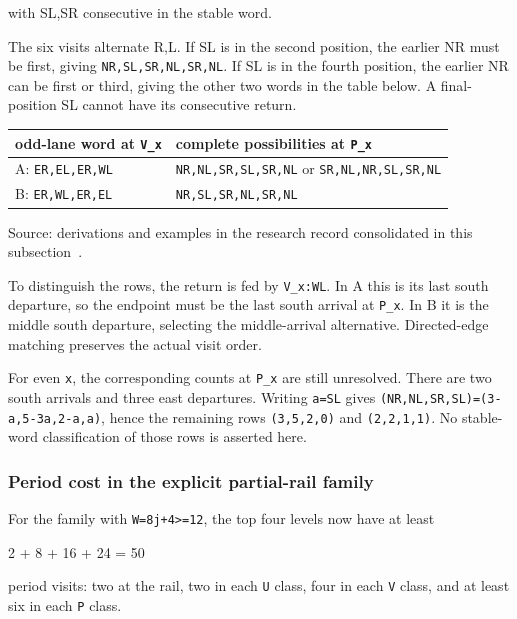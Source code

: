 \documentclass[11pt,letterpaper]{article}
\theoremstyle{plain}
\theoremstyle{definition}
\begin{document}
\begin{NoHyper}
with SL,SR consecutive in the stable word.

The six visits alternate R,L. If SL is in the second position, the earlier NR must be first, giving \texttt{NR,SL,SR,NL,SR,NL}. If SL is in the fourth position, the earlier NR can be first or third, giving the other two words in the table below. A final-position SL cannot have its consecutive return.

{\def\LTcaptype{table} %
\begin{longtable}[]{@{}ll@{}}
\toprule\noalign{}
odd-lane word at \texttt{V\_x} & complete possibilities at \texttt{P\_x} \\
\midrule\noalign{}
\endhead
\bottomrule\noalign{}
\endlastfoot
A: \texttt{ER,EL,ER,WL} & \texttt{NR,NL,SR,SL,SR,NL} or \texttt{SR,NL,NR,SL,SR,NL} \\
B: \texttt{ER,WL,ER,EL} & \texttt{NR,SL,SR,NL,SR,NL} \\
\end{longtable}
{\footnotesize Source: derivations and examples in the research record consolidated in this subsection~\cite{Repo}.\par}
}

To distinguish the rows, the return is fed by \texttt{V\_x:WL}. In A this is its last south departure, so the endpoint must be the last south arrival at \texttt{P\_x}. In B it is the middle south departure, selecting the middle-arrival alternative. Directed-edge matching preserves the actual visit order.

For even \texttt{x}, the corresponding counts at \texttt{P\_x} are still unresolved. There are two south arrivals and three east departures. Writing \texttt{a=SL} gives \texttt{(NR,NL,SR,SL)=(3-a,5-3a,2-a,a)}, hence the remaining rows \texttt{(3,5,2,0)} and \texttt{(2,2,1,1)}. No stable-word classification of those rows is asserted here.

\subsubsection{Period cost in the explicit partial-rail family}

For the family with \texttt{W=8j+4\textgreater{}=12}, the top four levels now have at least

\begin{codeblock}
2 + 8 + 16 + 24 = 50
\end{codeblock}

period visits: two at the rail, two in each \texttt{U} class, four in each \texttt{V} class, and at least six in each \texttt{P} class.


\end{NoHyper}
\end{document}
